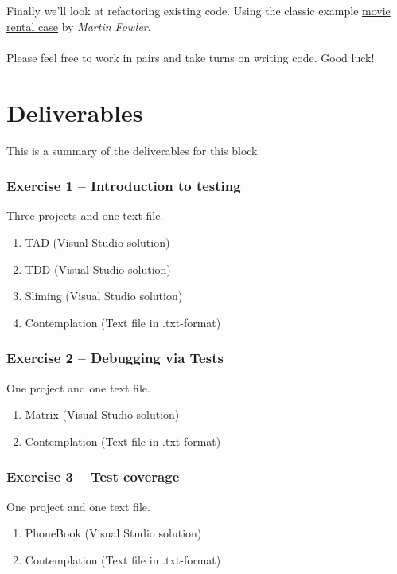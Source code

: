 \documentclass{article}
\begin{document}
      Finally we'll look at refactoring existing code. Using the classic example \href{http://www.cs.unc.edu/~stotts/723/refactor/chap1.html}{movie rental case} by \emph{Martin Fowler}.




    \paragraph{}
      Please feel free to work in pairs and take turns on writing code. Good luck!

    \tableofcontents


\pagebreak{}
\section*{Deliverables}
This is a summary of the deliverables for this block.

\subsubsection*{Exercise 1 -- Introduction to testing}
Three projects and one text file.
\begin{enumerate}
  \item TAD (Visual Studio solution)
  \item TDD (Visual Studio solution)
  \item Sliming (Visual Studio solution)
  \item Contemplation (Text file in .txt-format)
\end{enumerate}

\subsubsection*{Exercise 2 -- Debugging via Tests}
One project and one text file.
\begin{enumerate}
  \item Matrix (Visual Studio solution)
  \item Contemplation (Text file in .txt-format)
\end{enumerate}

\subsubsection*{Exercise 3 -- Test coverage}
One project and one text file.
\begin{enumerate}
  \item PhoneBook (Visual Studio solution)
  \item Contemplation (Text file in .txt-format)
\end{enumerate}
\end{document}
